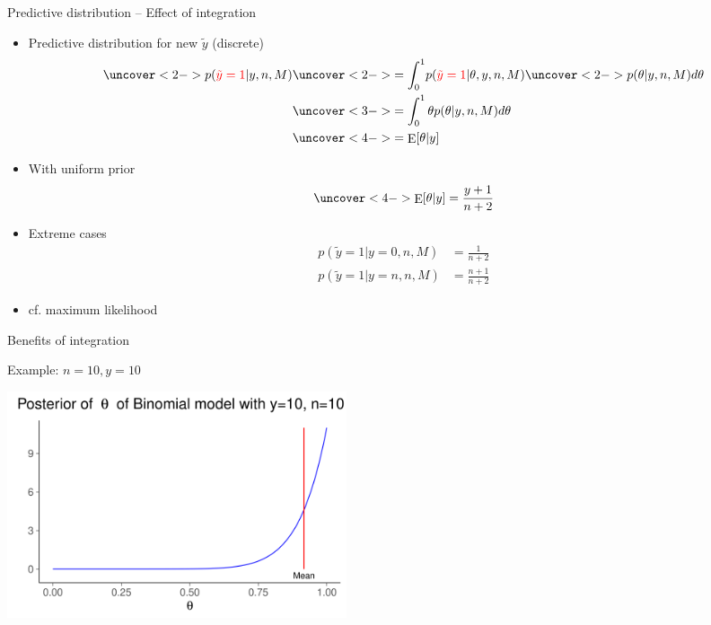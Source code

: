 \documentclass[english,t]{beamer}
\DeclareMathOperator{\E}{E}
\begin{document}
\begin{frame}{Predictive distribution -- Effect of integration}

  \begin{itemize}
  \item Predictive distribution for new $\tilde{y}$ (discrete)
    \begin{align*}
      \uncover<2->{p({\color{red}\tilde{y}=1}|y,n,M)} & \uncover<2->{= \int_0^1} p({\color{red}\tilde{y}=1}|\theta,y,n,M) \uncover<2->{p(\theta|y,n,M)d\theta}\\
                                                      &\uncover<3->{= \int_0^1 \theta p(\theta|y,n,M)d\theta}\\
                                                      &\uncover<4->{= \E[\theta|y]}
    \end{align*}
    \vskip -4mm
  \item<5-> With uniform prior
    \begin{align*}
      \uncover<4->{\E[\theta|y] = \frac{y+1}{n+2}}
    \end{align*}
  \item<6-> Extreme cases
    \begin{align*}
      p(\tilde{y}=1|y=0,n,M) &= \frac{1}{n+2} \\
      p(\tilde{y}=1|y=n,n,M) &= \frac{n+1}{n+2}
    \end{align*}
    \vskip -2mm

  \item<6-> cf. maximum likelihood

  \end{itemize}
\end{frame}

\begin{frame}{Benefits of integration}

  Example: $n=10, y=10$
  \begin{center}
    \includegraphics[width=10cm]{dbbeta10.pdf}
  \end{center}

\end{frame}
\end{document}
